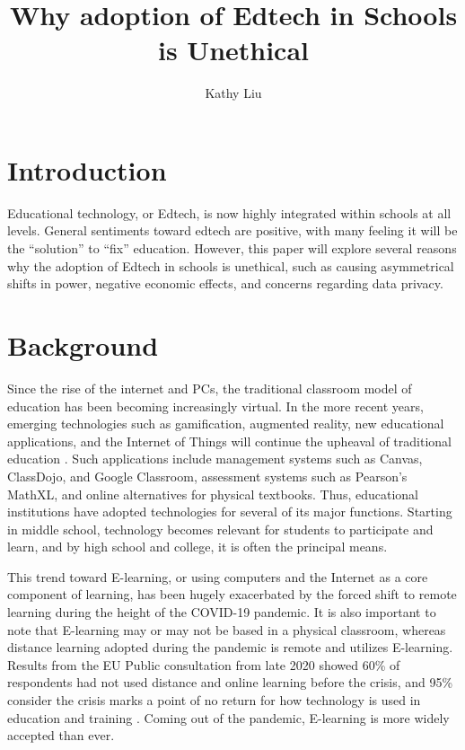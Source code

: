 \documentclass[10pt,twocolumn]{article}
\title{Why adoption of Edtech in Schools is Unethical}
\author{Kathy Liu}
\affiliation{Occidental College}
\begin{document}
\maketitle

\section{Introduction}
Educational technology, or Edtech, is now highly integrated within schools at all levels. General sentiments toward edtech are positive, with many feeling it will be the “solution” to “fix” education. However, this paper will explore several reasons why the adoption of Edtech in schools is unethical, such as causing asymmetrical shifts in power, negative economic effects, and concerns regarding data privacy.

\section{Background}
Since the rise of the internet and PCs, the traditional classroom model of education has been becoming increasingly virtual. In the more recent years, emerging technologies such as gamification, augmented reality, new educational applications, and the Internet of Things will continue the upheaval of traditional education \cite{zain_2021}. Such applications include management systems such as Canvas, ClassDojo, and Google Classroom, assessment systems such as Pearson’s MathXL, and online alternatives for physical textbooks. Thus, educational institutions have adopted technologies for several of its major functions. Starting in middle school, technology becomes relevant for students to participate and learn, and by high school and college, it is often the principal means. 

This trend toward E-learning, or using computers and the Internet as a core component of learning, has been hugely exacerbated by the forced shift to remote learning during the height of the COVID-19 pandemic. It is also important to note that E-learning may or may not be based in a physical classroom, whereas distance learning adopted during the pandemic is remote and utilizes E-learning. Results from the EU Public consultation from late 2020 showed 60\% of respondents had not used distance and online learning before the crisis, and 95\% consider the crisis marks a point of no return for how technology is used in education and training \cite{2020_EU_public_consultation}. Coming out of the pandemic, E-learning is more widely accepted than ever. 
 
\end{document}
